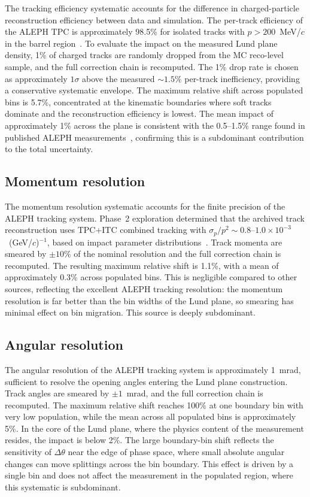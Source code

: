 \documentclass[11pt,a4paper]{article}
\begin{document}
The tracking efficiency systematic accounts for the difference in
charged-particle reconstruction efficiency between data and simulation.
The per-track efficiency of the ALEPH TPC is approximately 98.5\% for
isolated tracks with $p > 200$~MeV/$c$ in the barrel
region~\cite{ALEPH:1995aqm}.  To evaluate the impact on the measured
Lund plane density, 1\% of charged tracks are randomly dropped from the
MC reco-level sample, and the full correction chain is recomputed.  The
1\% drop rate is chosen as approximately $1\sigma$ above the measured
$\sim\!1.5\%$ per-track inefficiency, providing a conservative
systematic envelope.  The maximum relative shift across populated bins
is 5.7\%, concentrated at the kinematic boundaries where soft tracks
dominate and the reconstruction efficiency is lowest.  The mean impact
of approximately 1\% across the plane is consistent with the 0.5--1.5\%
range found in published ALEPH measurements~\cite{ALEPH:1998vtv},
confirming this is a subdominant contribution to the total uncertainty.

\subsection{Momentum resolution}
\label{sec:syst-momentum}

The momentum resolution systematic accounts for the finite precision
of the ALEPH tracking system.  Phase~2 exploration determined that
the archived track reconstruction uses TPC+ITC combined tracking
with $\sigma_p / p^2 \sim 0.8$--$1.0 \times 10^{-3}$~(GeV/$c$)$^{-1}$,
based on impact parameter distributions~\cite{ALEPH:1995aqm}.
Track momenta are smeared by $\pm 10\%$ of the nominal resolution and the
full correction chain is recomputed.  The resulting maximum relative shift
is 1.1\%, with a mean of approximately 0.3\% across populated bins.  This
is negligible compared to other sources, reflecting the excellent ALEPH
tracking resolution: the momentum resolution is far better than the bin
widths of the Lund plane, so smearing has minimal effect on bin migration.
This source is deeply subdominant.

\subsection{Angular resolution}
\label{sec:syst-angular}

The angular resolution of the ALEPH tracking system is approximately
1~mrad, sufficient to resolve the opening angles entering the Lund
plane construction.  Track angles are smeared by $\pm 1$~mrad, and the
full correction chain is recomputed.  The maximum relative shift reaches
100\% at one boundary bin with very low population, while the mean across
all populated bins is approximately 5\%.  In the core of the Lund plane,
where the physics content of the measurement resides, the impact is
below 2\%.  The large boundary-bin shift reflects the sensitivity of
$\Delta\theta$ near the edge of phase space, where small absolute
angular changes can move splittings across the bin boundary.  This
effect is driven by a single bin and does not affect the measurement
in the populated region, where this systematic is subdominant.
\end{document}
